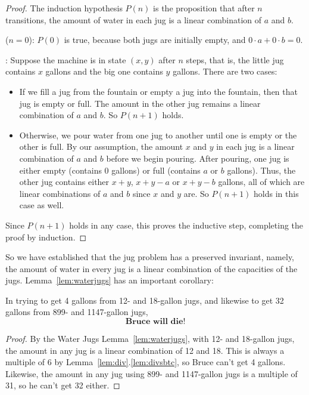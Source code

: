 \begin{proof}
The induction hypothesis $P(n)$ is the proposition that after $n$
transitions, the amount of water in each jug is a linear combination
of $a$ and $b$.

 ($n = 0$): $P(0)$ is true, because both jugs
are initially empty, and $0 \cdot a + 0 \cdot b = 0$.

: Suppose the machine is in state
$(x,y)$ after $n$ steps, that is, the little jug contains $x$ gallons
and the big one contains $y$ gallons.  There are two cases:

\begin{itemize}

\item If we fill a jug from the fountain or empty a jug into the
  fountain, then that jug is empty or full.  The amount in the other
  jug remains a linear combination of $a$ and $b$.  So $P(n+1)$ holds.

\item Otherwise, we pour water from one jug to another until one is
  empty or the other is full.  By our assumption, the amount $x$ and
  $y$ in each jug is a linear combination of $a$ and $b$ before we
  begin pouring.  After pouring, one jug is either empty (contains 0
  gallons) or full (contains $a$ or $b$ gallons).  Thus, the other jug
  contains either $x + y$, $x + y - a$ or $x + y - b$ gallons, all of
  which are linear combinations of $a$ and $b$ since $x$ and $y$ are.
  So $P(n+1)$ holds in this case as well.
\end{itemize}
Since $P(n+1)$ holds in any case, this proves the inductive step,
completing the proof by induction.
\end{proof}

So we have established that the jug problem has a preserved invariant,
namely, the amount of water in every jug is a linear combination of
the capacities of the jugs.  Lemma~\ref{lem:waterjugs} has an
important corollary:
\begin{corollary*}
In trying to get 4 gallons from 12- and 18-gallon jugs, and likewise
to get 32 gallons from 899- and 1147-gallon jugs,
\[
\textbf{Bruce will die!}
\]
\end{corollary*}

\begin{proof}
By the Water Jugs Lemma~\ref{lem:waterjugs}, with 12- and 18-gallon
jugs, the amount in any jug is a linear combination of 12 and 18.
This is always a multiple of 6 by
Lemma~\ref{lem:div}.\ref{lem:divsbtc}, so Bruce can't get 4 gallons.
Likewise, the amount in any jug using 899- and 1147-gallon jugs is a
multiple of 31, so he can't get 32 either.
\end{proof}

